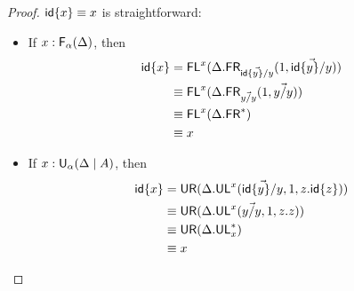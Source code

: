 \begin{proof}
${\mathsf{id}\{x\}} \equiv x$ is straightforward:
\begin{itemize}
\item If $x : \mathsf{F}_{\alpha}(\Delta)$, then
\begin{align*}
{\ensuremath{\mathsf{id}}\{x\}} 
&=\mathsf{FL}^{x}(\Delta.\mathsf{FR}_{\vec{{\mathsf{id}\{y\}}/y}}(1,\vec{{\mathsf{id}\{y\}}/y}))\\
&\equiv \mathsf{FL}^{x}(\Delta.\mathsf{FR}_{\vec{y/y}}(1,\vec{y/y}))\\
&\equiv \mathsf{FL}^{x}(\Delta.\mathsf{FR}^*)\\
&\equiv x
\end{align*}
\item If $x : \mathsf{U}_{\alpha}(\Delta \mid A)$, then
\begin{align*}
{\ensuremath{\mathsf{id}}\{x\}} 
&= \mathsf{UR}(\Delta.\mathsf{UL}^{x}_{}(\vec{{\mathsf{id}\{y\}}/y},1,z.{\mathsf{id}\{z\}}))\\
&\equiv \mathsf{UR}(\Delta.\mathsf{UL}^{x}_{}(\vec{y/y},1,z.z))\\
&\equiv \mathsf{UR}(\Delta.\mathsf{UL}^*_{x})\\
&\equiv x
\end{align*}
\end{itemize}


\end{proof}
